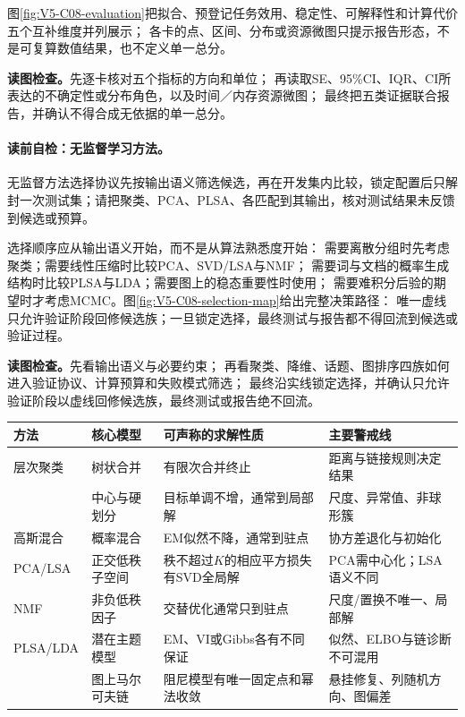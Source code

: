 图\ref{fig:V5-C08-evaluation}把拟合、预登记任务效用、稳定性、可解释性和计算代价五个互补维度并列展示；
各卡的点、区间、分布或资源微图只提示报告形态，不是可复算数值结果，也不定义单一总分。

\FloatBarrier
\noindent\textbf{读图检查。}先逐卡核对五个指标的方向和单位；
再读取SE、95\%CI、IQR、CI所表达的不确定性或分布角色，以及时间／内存资源微图；
最终把五类证据联合报告，并确认不得合成无依据的单一总分。

\paragraph{读前自检：无监督学习方法。}无监督方法选择协议先按输出语义筛选候选，再在开发集内比较，锁定配置后只解封一次测试集；请把聚类、PCA、PLSA、\PageRank{}各匹配到其输出，核对测试结果未反馈到候选或预算。\par


选择顺序应从输出语义开始，而不是从算法熟悉度开始：
需要离散分组时先考虑聚类；需要线性压缩时比较PCA、SVD/LSA与NMF；
需要词与文档的概率生成结构时比较PLSA与LDA；需要图上的稳态重要性时使用\PageRank{}；
需要难积分后验的期望时才考虑MCMC。图\ref{fig:V5-C08-selection-map}给出完整决策路径：
唯一虚线只允许验证阶段回修候选族；一旦锁定选择，最终测试与报告都不得回流到候选或验证过程。

\FloatBarrier
\noindent\textbf{读图检查。}先看输出语义与必要约束；
再看聚类、降维、话题、图排序四族如何进入验证协议、计算预算和失败模式筛选；
最终沿实线锁定选择，并确认只允许验证阶段以虚线回修候选族，最终测试或报告绝不回流。

\begin{center}
\small
\begin{tabularx}{\textwidth}{@{}p{}p{}Xp{}@{}}
\toprule
方法 & 核心模型 & 可声称的求解性质 & 主要警戒线 \\
\midrule
层次聚类 & 树状合并 & 有限次合并终止 & 距离与链接规则决定结果 \\
\kMeans{} & 中心与硬划分 & 目标单调不增，通常到局部解 & 尺度、异常值、非球形簇 \\
高斯混合 & 概率混合 & EM似然不降，通常到驻点 & 协方差退化与初始化 \\
PCA/LSA & 正交低秩子空间 & 秩不超过$K$的相应平方损失有SVD全局解 & PCA需中心化；LSA语义不同 \\
NMF & 非负低秩因子 & 交替优化通常只到驻点 & 尺度/置换不唯一、局部解 \\
PLSA/LDA & 潜在主题模型 & EM、VI或Gibbs各有不同保证 & 似然、ELBO与链诊断不可混用 \\
\PageRank{} & 图上马尔可夫链 & 阻尼模型有唯一固定点和幂法收敛 & 悬挂修复、列随机方向、图偏差 \\
\bottomrule
\end{tabularx}
\end{center}


